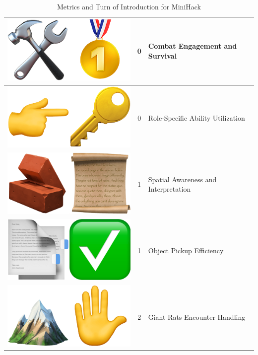 \begin{table}[ht]
\begin{tabular}{|c|c|l|}
\hline
\rowcolor{gray!10} \includegraphics[scale=0.07]{figs/emojis/emoji_5.png} & 0 & Combat Engagement and Survival \\
\hline
\rowcolor{gray!10} \includegraphics[scale=0.07]{figs/emojis/emoji_6.png} & 0 & Role-Specific Ability Utilization  \\
\hline
\rowcolor{gray!30} \includegraphics[scale=0.07]{figs/emojis/emoji_7.png} & 1 & Spatial Awareness and Interpretation  \\
\hline
\rowcolor{gray!30} \includegraphics[scale=0.07]{figs/emojis/emoji_8.png} & 1 & Object Pickup Efficiency \\
\hline
\rowcolor{gray!60} \includegraphics[scale=0.07]{figs/emojis/emoji_9.png} & 2 & Giant Rats Encounter Handling \\
\hline
\end{tabular}
\caption{Metrics and Turn of Introduction for MiniHack}
\end{table}

